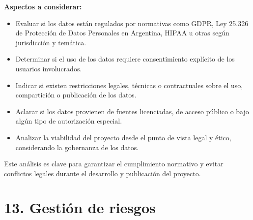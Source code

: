\documentclass[
11pt, %
]{charter}
\begin{document}
\textbf{Aspectos a considerar:}
\begin{itemize}
  \item Evaluar si los datos están regulados por normativas como GDPR, Ley 25.326 de Protección de Datos Personales en Argentina, HIPAA u otras según jurisdicción y temática.
  \item Determinar si el uso de los datos requiere consentimiento explícito de los usuarios involucrados.
  \item Indicar si existen restricciones legales, técnicas o contractuales sobre el uso, compartición o publicación de los datos.
  \item Aclarar si los datos provienen de fuentes licenciadas, de acceso público o bajo algún tipo de autorización especial.
  \item Analizar la viabilidad del proyecto desde el punto de vista legal y ético, considerando la gobernanza de los datos.
\end{itemize}

Este análisis es clave para garantizar el cumplimiento normativo y evitar conflictos legales durante el desarrollo y publicación del proyecto.


\section{13. Gestión de riesgos}
\label{sec:riesgos}
\end{document}
